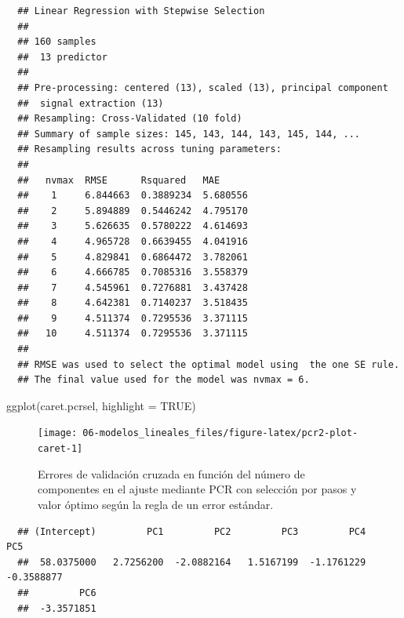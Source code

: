 \documentclass[
]{book}
\newenvironment{Shaded}{\begin{snugshade}}{\end{snugshade}}
\newcommand{\AttributeTok}[1]{\textcolor[rgb]{0.77,0.63,0.00}{#1}}
\newcommand{\ConstantTok}[1]{\textcolor[rgb]{0.00,0.00,0.00}{#1}}
\newcommand{\FunctionTok}[1]{\textcolor[rgb]{0.00,0.00,0.00}{#1}}
\newcommand{\NormalTok}[1]{#1}
\newcommand{\SpecialCharTok}[1]{\textcolor[rgb]{0.00,0.00,0.00}{#1}}
\theoremstyle{break}
\theoremstyle{nonumberplain}
\begin{document}
\begin{verbatim}
  ## Linear Regression with Stepwise Selection 
  ## 
  ## 160 samples
  ##  13 predictor
  ## 
  ## Pre-processing: centered (13), scaled (13), principal component
  ##  signal extraction (13) 
  ## Resampling: Cross-Validated (10 fold) 
  ## Summary of sample sizes: 145, 143, 144, 143, 145, 144, ... 
  ## Resampling results across tuning parameters:
  ## 
  ##   nvmax  RMSE      Rsquared   MAE     
  ##    1     6.844663  0.3889234  5.680556
  ##    2     5.894889  0.5446242  4.795170
  ##    3     5.626635  0.5780222  4.614693
  ##    4     4.965728  0.6639455  4.041916
  ##    5     4.829841  0.6864472  3.782061
  ##    6     4.666785  0.7085316  3.558379
  ##    7     4.545961  0.7276881  3.437428
  ##    8     4.642381  0.7140237  3.518435
  ##    9     4.511374  0.7295536  3.371115
  ##   10     4.511374  0.7295536  3.371115
  ## 
  ## RMSE was used to select the optimal model using  the one SE rule.
  ## The final value used for the model was nvmax = 6.
\end{verbatim}

\begin{Shaded}
\begin{Highlighting}[]
\FunctionTok{ggplot}\NormalTok{(caret.pcrsel, }\AttributeTok{highlight =} \ConstantTok{TRUE}\NormalTok{)}
\end{Highlighting}
\end{Shaded}

\begin{figure}[!htb]

{\centering \texttt{[image: 06-modelos\_lineales\_files/figure-latex/pcr2-plot-caret-1]} 

}

\caption{Errores de validación cruzada en función del número de componentes en el ajuste mediante PCR con selección por pasos y valor óptimo según la regla de un error estándar.}\label{fig:pcr2-plot-caret}
\end{figure}

\begin{Shaded}
\end{Shaded}

\begin{verbatim}
  ## (Intercept)         PC1         PC2         PC3         PC4         PC5 
  ##  58.0375000   2.7256200  -2.0882164   1.5167199  -1.1761229  -0.3588877 
  ##         PC6 
  ##  -3.3571851
\end{verbatim}
\end{document}
